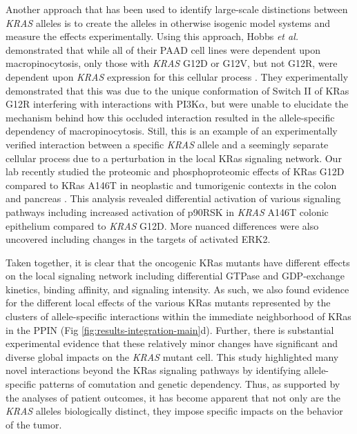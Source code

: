 \documentclass[english, 10pt, letterpaper]{article}
\newcommand{\KRAS}{\emph{KRAS}}
\newcommand{\kras}{KRas}
\begin{document}
Another approach that has been used to identify large-scale distinctions between \KRAS{} alleles is to create the alleles in otherwise isogenic model systems and measure the effects experimentally.
Using this approach, Hobbs \emph{et al.} demonstrated that while all of their PAAD cell lines were dependent upon macropinocytosis, only those with \KRAS{} G12D or G12V, but not G12R, were dependent upon \KRAS{} expression for this cellular process \cite{Hobbs2019AtypicalCancer.}.
They experimentally demonstrated that this was due to the unique conformation of Switch II of \kras{} G12R interfering with interactions with PI3K$\alpha$, but were unable to elucidate the mechanism behind how this occluded interaction resulted in the allele-specific dependency of macropinocytosis.
Still, this is an example of an experimentally verified interaction between a specific \KRAS{} allele and a seemingly separate cellular process due to a perturbation in the local \kras{} signaling network.
Our lab recently studied the proteomic and phosphoproteomic effects of \kras{} G12D compared to \kras{} A146T in neoplastic and tumorigenic contexts in the colon and pancreas \cite{Poulin2019}.
This analysis revealed differential activation of various signaling pathways including increased activation of p90RSK in \KRAS{} A146T colonic epithelium compared to \KRAS{} G12D.
More nuanced differences were also uncovered including changes in the targets of activated ERK2.

Taken together, it is clear that the oncogenic \kras{} mutants have different effects on the local signaling network including differential GTPase and GDP-exchange kinetics, binding affinity, and signaling intensity.
As such, we also found evidence for the different local effects of the various \kras{} mutants represented by the clusters of allele-specific interactions within the immediate neighborhood of \kras{} in the PPIN (Fig \ref{fig:results-integration-main}d).
Further, there is substantial experimental evidence that these relatively minor changes have significant and diverse global impacts on the \KRAS{} mutant cell.
This study highlighted many novel interactions beyond the \kras{} signaling pathways by identifying allele-specific patterns of comutation and genetic dependency.
Thus, as supported by the analyses of patient outcomes, it has become apparent that not only are the \KRAS{} alleles biologically distinct, they impose specific impacts on the behavior of the tumor.

\end{document}
